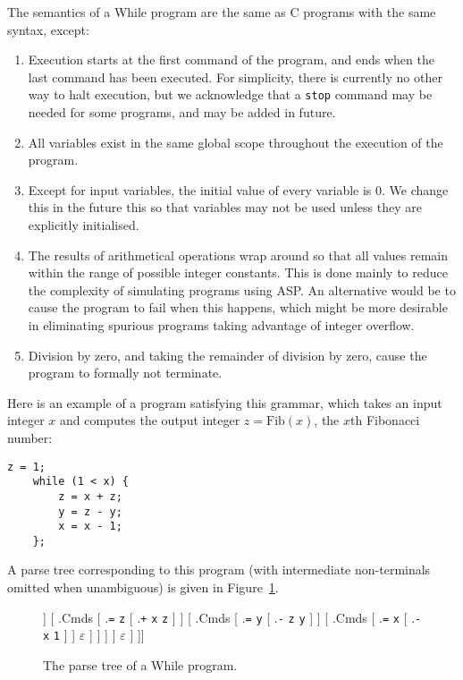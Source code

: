 \documentclass[a4paper,twoside,notitlepage]{article}
\newcommand{\ttt}{\texttt}
\newcommand{\trm}{\textrm}
\begin{document}
The semantics of a While program are the same as C programs with the same 
syntax, except:
\begin{enumerate}
    \item Execution starts at the first command of the program, and ends when 
    the last command has been executed. For simplicity, there is currently no 
    other way to halt execution, but we acknowledge that a \ttt{stop} command 
    may be needed for some programs, and may be added in future.
    \item All variables exist in the same global scope throughout the 
    execution of the program.
    \item Except for input variables, the initial value of every variable is 0.
    We change this in the future this so that variables may not be used unless 
    they are explicitly initialised.
    \item The results of arithmetical operations wrap around so that all 
    values remain within the range of possible integer constants. This is done 
    mainly to reduce the complexity of simulating programs using ASP. An 
    alternative would be to cause the program to fail when this happens, which 
    might be more desirable in eliminating spurious programs taking advantage 
    of integer overflow.
    \item Division by zero, and taking the remainder of division by zero,
    cause the program to formally not terminate.
\end{enumerate}

Here is an example of a program satisfying this grammar, which takes an input 
integer $x$ and computes the output integer $z=\trm{Fib}(x)$, the $x$th 
Fibonacci number:
\begin{Verbatim}[samepage=true]
    z = 1;
    while (1 < x) {
        z = x + z;
        y = z - y;
        x = x - 1;
    };
\end{Verbatim}

A parse tree corresponding to this program (with intermediate non-terminals 
omitted when unambiguous) is given in Figure~\ref{fig:fibtree}.

\begin{figure}[h]
  \caption{The parse tree of a While program.}
  \label{fig:fibtree}
  \Tree[ .Prog [ .Cmds
    [ .\ttt{=} \ttt{x} \ttt{1} ]
    [ .Cmds
      [ .\ttt{while}
        [ .Bool [ .\ttt{<} \ttt{1} \ttt{x} ] ]
        [ .Cmds
          [ .\ttt{=} \ttt{z} [ .\ttt{+} \ttt{x} \ttt{z} ] ]
            [ .Cmds
              [ .\ttt{=} \ttt{y} [ .\ttt{-} \ttt{z} \ttt{y} ] ]
              [ .Cmds
                [ .\ttt{=} \ttt{x} [ .\ttt{-} \ttt{x} \ttt{1} ] ]
                $\varepsilon$
              ]
            ]
          ]
        ]
      $\varepsilon$
    ]
  ]]
\end{figure}
\end{document}
